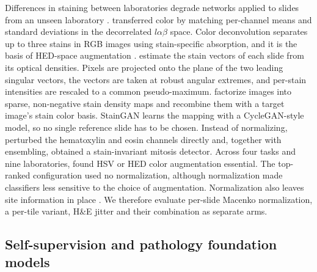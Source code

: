 Differences in staining between laboratories degrade networks applied to
slides from an unseen laboratory \citep{tellez2019stain}.
\citet{reinhard2001color} transferred color by matching per-channel means and
standard deviations in the decorrelated $l\alpha\beta$ space. Color
deconvolution \citep{ruifrok2001deconvolution} separates up to three stains in
RGB images using stain-specific absorption, and it is the basis of HED-space
augmentation \citep{tellez2019stain}. \citet{macenko2009} estimate the stain
vectors of each slide from its optical densities. Pixels are projected onto the
plane of the two leading singular vectors, the vectors are taken at robust
angular extremes, and per-stain intensities are rescaled to a common
pseudo-maximum. \citet{vahadane2016structure} factorize images into sparse,
non-negative stain density maps and recombine them with a target image's stain
color basis. StainGAN \citep{shaban2019staingan} learns the mapping with a
CycleGAN-style model, so no single reference slide has to be chosen. Instead of normalizing,
\citet{tellez2018whole} perturbed the hematoxylin and eosin channels directly
and, together with ensembling, obtained a stain-invariant mitosis detector.
Across four tasks and nine laboratories, \citet{tellez2019stain} found HSV or
HED color augmentation essential. The top-ranked configuration used no
normalization, although normalization made classifiers less sensitive to the
choice of augmentation. Normalization also leaves site information in place
\citep{howard2021site}. We therefore evaluate per-slide Macenko normalization,
a per-tile variant, H\&E jitter and their combination as separate arms.

\subsection{Self-supervision and pathology foundation models}
\label{sec:related-fm}


